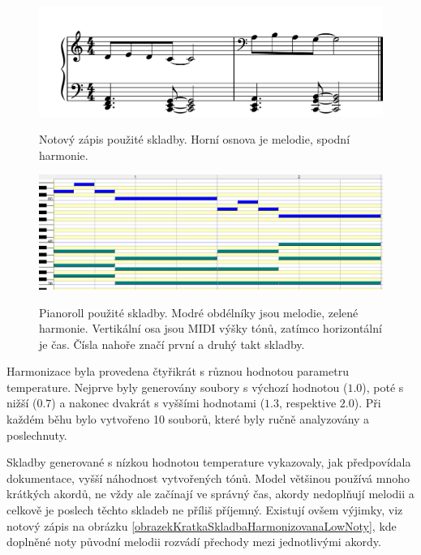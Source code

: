 \begin{figure}[h]\centering
    \centering
    \includegraphics[width=0.8\linewidth]{obrazky/KratkaSkladbaKHarmonizaciNoty.png}\\[1pt]  
    \caption{Notový zápis použité skladby. Horní osnova je melodie, spodní harmonie.}    
    \label{obrazekNotyKratkeZname}
\end{figure}
\begin{figure}[h]\centering
    \centering
    \includegraphics[width=0.8\linewidth]{obrazky/KratkaSkladbaKHarmonizaciPianoRoll.png}\\[1pt]  
    \caption{Pianoroll použité skladby. Modré obdélníky jsou melodie, zelené harmonie.
    Vertikální osa jsou MIDI výšky tónů, zatímco horizontální je čas. 
    Čísla nahoře značí první a druhý takt skladby.}    
    \label{obrazekPianoRollKratkeZname}
\end{figure}

Harmonizace byla provedena čtyřikrát 
s různou hodnotou parametru temperature.
Nejprve byly generovány soubory s výchozí hodnotou ($1.0$),
poté s nižší ($0.7$) a nakonec dvakrát s vyššími hodnotami ($1.3$, respektive $2.0$).
Při každém běhu bylo vytvořeno 10 souborů,
které byly ručně analyzovány a poslechnuty.
\par

Skladby generované s nízkou hodnotou temperature vykazovaly,
jak předpovídala dokumentace, vyšší náhodnost vytvořených tónů.
Model většinou používá mnoho krátkých akordů, 
ne vždy ale začínají ve správný čas, akordy nedoplňují melodii 
a celkově je poslech těchto skladeb ne příliš příjemný.
Existují ovšem výjimky, viz notový zápis na obrázku 
\ref{obrazekKratkaSkladbaHarmonizovanaLowNoty},
kde doplněné noty původní melodii rozvádí přechody mezi jednotlivými akordy.

